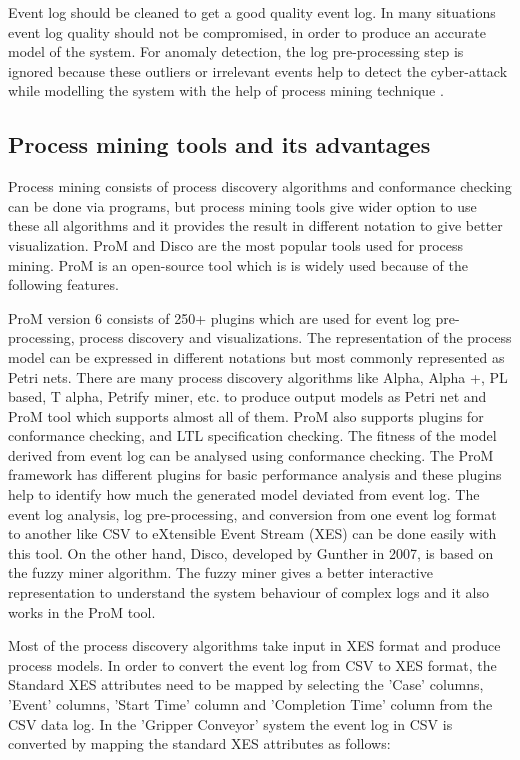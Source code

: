 \documentclass[conference]{IEEEtran}
\begin{document}
 Event log should be cleaned to get a good quality event log. In many situations event log quality should not be compromised,  in order to produce an accurate model of the system. For anomaly detection, the log pre-processing step is ignored because these outliers or irrelevant events help to detect the cyber-attack while modelling the system with the help of process mining technique \cite{paper2}.
 

 \subsection{Process mining tools and its advantages}

Process mining consists of process discovery algorithms and conformance checking can be done via programs, but process mining tools give wider option to use these all algorithms and it provides the result in different notation to give better visualization. ProM \cite{ProM} \cite{van2005prom} and Disco \cite{Disco} \cite{gunther2012disco} are the most popular tools used for process mining. ProM is an open-source tool which is is widely used because of the following features.


ProM version 6 consists of 250+ plugins which are used for event log pre-processing, process discovery and visualizations. The representation of the process model can be expressed in different notations but most commonly represented as Petri nets. There are many process discovery algorithms \cite{van2009process} like Alpha, Alpha +, PL based, T alpha, Petrify miner, etc. to produce output models as Petri net and ProM tool which supports almost all of them. ProM also supports plugins for conformance checking, and LTL specification checking. The fitness of the model derived from event log can be analysed using conformance checking. The ProM framework has different plugins for basic performance analysis and these plugins help to identify how much the generated model deviated from event log. The event log analysis, log pre-processing, and conversion from one event log format to another like CSV to eXtensible Event Stream (XES) can be done easily with this tool. On the other hand, Disco, developed by Gunther in 2007, is based on the fuzzy miner algorithm.  The fuzzy miner gives a better interactive representation to understand the system behaviour of complex logs and it also works in the ProM tool.

Most of the process discovery algorithms take input in XES format and produce process models. In order to convert the event log from CSV to XES format, the Standard XES attributes need to be mapped by selecting the ’Case’ columns, ’Event’ columns, ’Start Time’ column and ’Completion Time’ column from the CSV data log. In the ’Gripper Conveyor’ system the event log in CSV is converted by mapping the standard XES attributes as follows:
\end{document}
